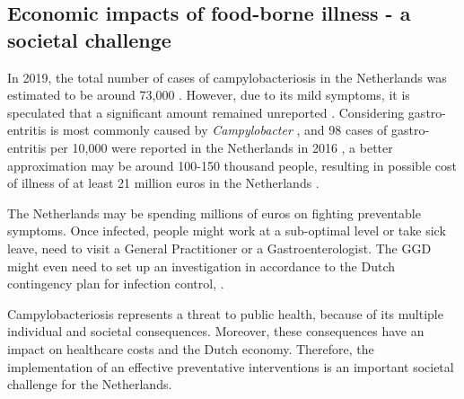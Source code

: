 \subsection*{Economic impacts of food-borne illness - a societal challenge}


In 2019, the total number of cases of campylobacteriosis in the Netherlands was estimated to be around 73,000 \parencite{lagerweij_disease_2020}. However, due to its mild symptoms, it is speculated that a significant amount remained unreported \parencite{koutsoumanis_update_2020}. Considering gastro-entritis is most commonly caused by \textit{Campylobacter} \parencite{fouts_major_2005}, and 98 cases of gastro-entritis per 10,000 were reported in the Netherlands in 2016 \parencite{van_pelt_jaarraport_2016}, a better approximation may be around 100-150 thousand people, resulting in possible cost of illness of at least 21 million euros in the Netherlands \parencite{havelaar_costs_2005}.

The Netherlands may be spending millions of euros on fighting preventable symptoms. Once infected, people might work at a sub-optimal level or take sick leave, need to visit a General Practitioner or a Gastroenterologist. The GGD might even need to set up an investigation in accordance to the Dutch contingency plan for infection control, . 

Campylobacteriosis represents a threat to public health, because of its multiple individual and societal consequences. Moreover, these consequences have an impact on healthcare costs and the Dutch economy. Therefore, the implementation of an effective preventative interventions is an important societal challenge for the Netherlands.




